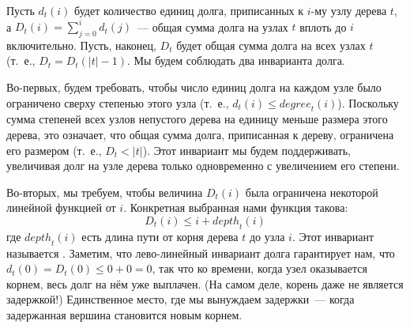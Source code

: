Пусть $d_t(i)$ будет количество единиц долга, приписанных к $i$-му
узлу дерева $t$, а $D_t(i) = \sum_{j=0}^i d_t(j)$~--- общая сумма
долга на узлах $t$ вплоть до $i$ включительно. Пусть, наконец, $D_t$
будет общая сумма долга на всех узлах $t$ (т.~е., $D_t = D_t(|t| -
1)$. Мы будем соблюдать два инварианта долга.

Во-первых, будем требовать, чтобы число единиц долга на каждом узле
было ограничено сверху степенью этого узла (т.~е., $d_t(i) \le
\mathit{degree}_t(i)$). Поскольку сумма степеней всех узлов непустого дерева на
единицу меньше размера этого дерева, это означает, что общая сумма
долга, приписанная к дереву, ограничена его размером (т.~е., $D_t <
|t|$). Этот инвариант мы будем поддерживать, увеличивая долг на узле
дерева только одновременно с увеличением его степени.

Во-вторых, мы требуем, чтобы величина $D_t(i)$ была ограничена
некоторой линейной функцией от $i$. Конкретная выбранная нами функция
такова:
$$
D_t(i) \le i + \mathit{depth}_t(i) 
$$
где $\mathit{depth}_t(i)$ есть длина пути от корня дерева $t$ до узла
$i$. Этот инвариант называется . Заметим, что лево-линейный
инвариант долга гарантирует нам, что $d_t(0) = D_t(0) \le 0 + 0 = 0$,
так что ко времени, когда узел оказывается корнем, весь долг на нём
уже выплачен. (На самом деле, корень даже не является задержкой!)
Единственное место, где мы вынуждаем задержки~---  когда задержанная
вершина становится новым корнем.

